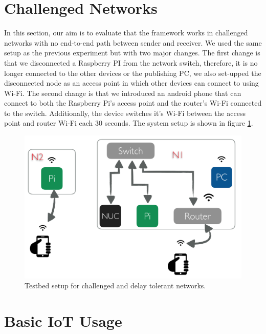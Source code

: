 \section{Challenged Networks}
In this section, our aim is to evaluate that the framework works in challenged networks with no end-to-end path between  sender and receiver. We used the same setup as the previous experiment but with two major changes. The first change is that we disconnected  a Raspberry PI from the network switch, therefore, it is no longer connected to the other devices or the publishing PC, we also set-upped the disconnected node as an access point in which other devices can connect to using Wi-Fi. The second change is that we introduced an android phone that can connect to both the Raspberry Pi's access point and the router's Wi-Fi connected to the switch. Additionally, the device switches it's Wi-Fi between the access point and router Wi-Fi each 30 seconds. The system setup is shown in figure \ref{fig:tb-dtn}.
\begin{figure}[H]
	\centering
	\includegraphics[scale=0.6]{images/tb-dtn.png}
	\caption{Testbed setup for challenged and delay tolerant networks.}
	\label{fig:tb-dtn}
\end{figure} 

\section{Basic IoT Usage}


